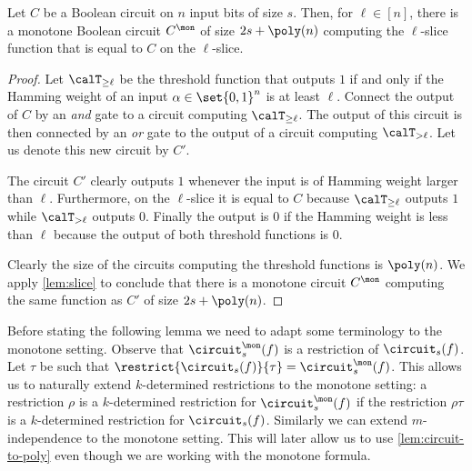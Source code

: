 \begin{claim}
  \label{clm:to-slice}
  Let $C$ be a Boolean circuit on $n$ input bits of size $s$. Then,
  for $\ell \in [n]$, there is a monotone Boolean circuit $C^\mon$ of
  size $2s + \poly(n)$ computing the $\ell$-slice function that is
  equal to $C$ on the $\ell$-slice.
\end{claim}

\begin{proof}
  Let $\calT_{\ge \ell}$ be the threshold function that outputs $1$ if
  and only if the Hamming weight of an input $\alpha \in \set{0,1}^n$
  is at least $\ell$. Connect the output of $C$ by an \emph{and} gate
  to a circuit computing $\calT_{\ge \ell}$. The output of this
  circuit is then connected by an \emph{or} gate to the output of a
  circuit computing $\calT_{> \ell}$. Let us denote this new circuit
  by $C'$.

  The circuit $C'$ clearly outputs $1$ whenever the input is of
  Hamming weight larger than $\ell$. Furthermore, on the $\ell$-slice
  it is equal to $C$ because $\calT_{\ge \ell}$ outputs $1$ while
  $\calT_{> \ell}$ outputs $0$. Finally the output is $0$ if the
  Hamming weight is less than $\ell$ because the output of both
  threshold functions is $0$.

  Clearly the size of the circuits computing the threshold functions
  is $\poly(n)$. We apply \cref{lem:slice} to conclude that there is a
  monotone circuit $C^\mon$ computing the same function as $C'$ of
  size $2s + \poly(n)$.
\end{proof}

Before stating the following lemma we need to adapt some terminology
to the monotone setting. Observe that $\circuit_s^\mon(f)$ is a
restriction of $\circuit_s(f)$. Let $\tau$ be such that
$\restrict{\circuit_s(f)}{\tau} = \circuit^\mon_s(f)$. This allows us
to naturally extend $k$-determined restrictions to the monotone
setting: a restriction $\rho$ is a $k$-determined restriction for
$\circuit^\mon_s(f)$ if the restriction $\rho \tau$ is a
$k$-determined restriction for $\circuit_s(f)$. Similarly we can
extend $m$-independence to the monotone setting. This will later allow
us to use \cref{lem:circuit-to-poly} even though we are working with
the monotone formula.


